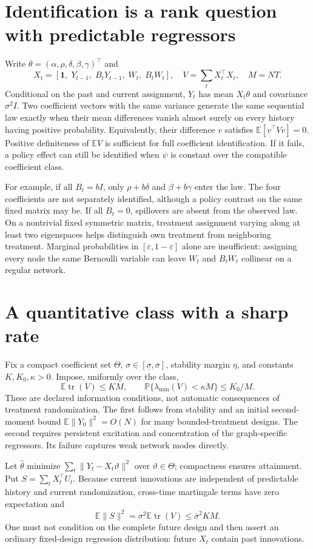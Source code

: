 \documentclass[11pt]{article}
\newcommand{\E}{\mathbb E}
\newcommand{\Prb}{\mathbb P}
\begin{document}
\section*{Identification is a rank question with predictable regressors}
Write $\theta=(\alpha,\rho,\delta,\beta,\gamma)^\top$ and
\[
 X_t=[\mathbf1,\;Y_{t-1},\;B_tY_{t-1},\;W_t,\;B_tW_t],\quad
 V=\sum_tX_t^\top X_t,\quad M=NT.
\]
Conditional on the past and current assignment, $Y_t$ has mean $X_t\theta$ and covariance $\sigma^2I$. Two coefficient vectors with the same variance generate the same sequential law exactly when their mean differences vanish almost surely on every history having positive probability. Equivalently, their difference $v$ satisfies $\E[v^\top Vv]=0$. Positive definiteness of $\E V$ is sufficient for full coefficient identification. If it fails, a policy effect can still be identified when $\psi$ is constant over the compatible coefficient class.

For example, if all $B_t=bI$, only $\rho+b\delta$ and $\beta+b\gamma$ enter the law. The four coefficients are not separately identified, although a policy contrast on the same fixed matrix may be. If all $B_t=0$, spillovers are absent from the observed law. On a nontrivial fixed symmetric matrix, treatment assignment varying along at least two eigenspaces helps distinguish own treatment from neighboring treatment. Marginal probabilities in $[\varepsilon,1-\varepsilon]$ alone are insufficient: assigning every node the same Bernoulli variable can leave $W_t$ and $B_tW_t$ collinear on a regular network.

\section*{A quantitative class with a sharp rate}
Fix a compact coefficient set $\Theta$, $\sigma\in[\underline\sigma,\overline\sigma]$, stability margin $\eta$, and constants $K,K_0,\kappa>0$. Impose, uniformly over the class,
\[
 \E\operatorname{tr}(V)\leq KM,\qquad
 \Prb\{\lambda_{\min}(V)<\kappa M\}\leq K_0/M.\tag{D}
\]
These are declared information conditions, not automatic consequences of treatment randomization. The first follows from stability and an initial second-moment bound $\E\|Y_0\|^2=O(N)$ for many bounded-treatment designs. The second requires persistent excitation and concentration of the graph-specific regressors. Its failure captures weak network modes directly.

Let $\widehat\theta$ minimize $\sum_t\|Y_t-X_t\vartheta\|^2$ over $\vartheta\in\Theta$; compactness ensures attainment. Put $S=\sum_tX_t^\top U_t$. Because current innovations are independent of predictable history and current randomization, cross-time martingale terms have zero expectation and
\[
 \E\|S\|^2=\sigma^2\E\operatorname{tr}(V)
 \leq\overline\sigma^2KM.
\]
One must not condition on the complete future design and then assert an ordinary fixed-design regression distribution: future $X_t$ contain past innovations.
\end{document}

